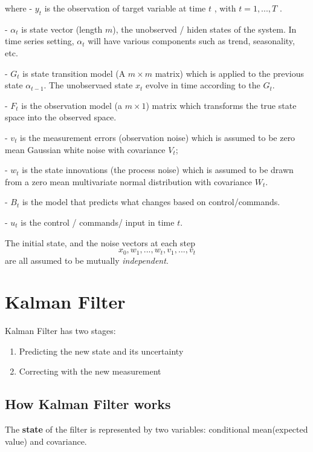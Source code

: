 where 
-  $y_{t}$ is the observation of target variable  at time $t$ , with $t = 1,..., T$ .

-  $\alpha_t$ is state vector (length $m$), the unobserved / hiden states of the system. In time series setting, $\alpha_t$ will have various components such as trend, seasonality, etc.  

-  $G_t$ is state transition model (A $m \times m$ matrix) which is applied to the previous state $\alpha_{t-1}$. The unobservaed state $x_t$ evolve in time according to the $G_t$. 

- $F_t$ is the observation model (a $m \times 1 $)  matrix which transforms the true state space into the observed space. 

- $v_t$ is the measurement errors (observation noise) which is assumed to be zero mean Gaussian white noise with covariance $V_t$;

- $w_t$ is the state innovations (the process noise) which is assumed to be drawn from a zero mean multivariate normal distribution with covariance $W_t$.

- $B_t$ is the model that predicts what changes based on  control/commands.

- $u_t$ is the control / commands/ input  in time $t$.


The initial state, and the noise vectors at each step 
$${x_0, w_1, ..., w_t, v_1, ..., v_t}$$ are all assumed to be mutually \textit{independent}.




\section{Kalman Filter} 

Kalman Filter has two stages: 

\begin{enumerate}
	\item{Predicting the new state and its uncertainty}
	\item{Correcting with the new measurement}
\end{enumerate}





\subsection{How Kalman Filter works}



The \textbf{state} of the filter is represented by two variables: conditional mean(expected value) and covariance. 

